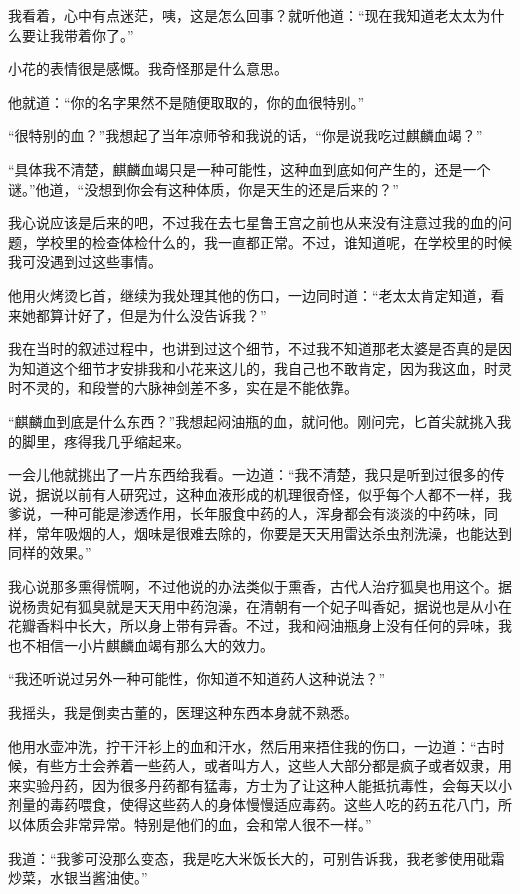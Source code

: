 我看着，心中有点迷茫，咦，这是怎么回事？就听他道：“现在我知道老太太为什么要让我带着你了。”

小花的表情很是感慨。我奇怪那是什么意思。

他就道：“你的名字果然不是随便取取的，你的血很特别。”

“很特别的血？”我想起了当年凉师爷和我说的话，“你是说我吃过麒麟血竭？”

“具体我不清楚，麒麟血竭只是一种可能性，这种血到底如何产生的，还是一个谜。”他道，“没想到你会有这种体质，你是天生的还是后来的？”

我心说应该是后来的吧，不过我在去七星鲁王宫之前也从来没有注意过我的血的问题，学校里的检查体检什么的，我一直都正常。不过，谁知道呢，在学校里的时候我可没遇到过这些事情。

他用火烤烫匕首，继续为我处理其他的伤口，一边同时道：“老太太肯定知道，看来她都算计好了，但是为什么没告诉我？”

我在当时的叙述过程中，也讲到过这个细节，不过我不知道那老太婆是否真的是因为知道这个细节才安排我和小花来这儿的，我自己也不敢肯定，因为我这血，时灵时不灵的，和段誉的六脉神剑差不多，实在是不能依靠。

“麒麟血到底是什么东西？”我想起闷油瓶的血，就问他。刚问完，匕首尖就挑入我的脚里，疼得我几乎缩起来。

一会儿他就挑出了一片东西给我看。一边道：“我不清楚，我只是听到过很多的传说，据说以前有人研究过，这种血液形成的机理很奇怪，似乎每个人都不一样，我爹说，一种可能是渗透作用，长年服食中药的人，浑身都会有淡淡的中药味，同样，常年吸烟的人，烟味是很难去除的，你要是天天用雷达杀虫剂洗澡，也能达到同样的效果。”

我心说那多熏得慌啊，不过他说的办法类似于熏香，古代人治疗狐臭也用这个。据说杨贵妃有狐臭就是天天用中药泡澡，在清朝有一个妃子叫香妃，据说也是从小在花瓣香料中长大，所以身上带有异香。不过，我和闷油瓶身上没有任何的异味，我也不相信一小片麒麟血竭有那么大的效力。

“我还听说过另外一种可能性，你知道不知道药人这种说法？”

我摇头，我是倒卖古董的，医理这种东西本身就不熟悉。

他用水壶冲洗，拧干汗衫上的血和汗水，然后用来捂住我的伤口，一边道：“古时候，有些方士会养着一些药人，或者叫方人，这些人大部分都是疯子或者奴隶，用来实验丹药，因为很多丹药都有猛毒，方士为了让这种人能抵抗毒性，会每天以小剂量的毒药喂食，使得这些药人的身体慢慢适应毒药。这些人吃的药五花八门，所以体质会非常异常。特别是他们的血，会和常人很不一样。”

我道：“我爹可没那么变态，我是吃大米饭长大的，可别告诉我，我老爹使用砒霜炒菜，水银当酱油使。”

